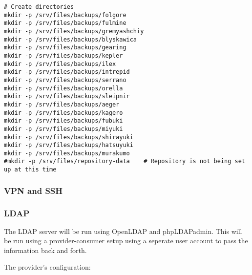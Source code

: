\documentclass[12pt]{spieman}  %
\begin{document}
\begin{lstlisting}
# Create directories
mkdir -p /srv/files/backups/folgore
mkdir -p /srv/files/backups/fulmine
mkdir -p /srv/files/backups/gremyashchiy
mkdir -p /srv/files/backups/blyskawica
mkdir -p /srv/files/backups/gearing
mkdir -p /srv/files/backups/kepler
mkdir -p /srv/files/backups/ilex
mkdir -p /srv/files/backups/intrepid
mkdir -p /srv/files/backups/serrano
mkdir -p /srv/files/backups/orella
mkdir -p /srv/files/backups/sleipnir
mkdir -p /srv/files/backups/aeger
mkdir -p /srv/files/backups/kagero
mkdir -p /srv/files/backups/fubuki
mkdir -p /srv/files/backups/miyuki
mkdir -p /srv/files/backups/shirayuki
mkdir -p /srv/files/backups/hatsuyuki
mkdir -p /srv/files/backups/murakumo
#mkdir -p /srv/files/repository-data	# Repository is not being set up at this time
\end{lstlisting}

\subsubsection{VPN and SSH}
\label{subsubsec:vpn-config}

\subsubsection{LDAP}
\label{subsubsec:ldap-config}

The LDAP server will be run using OpenLDAP and phpLDAPadmin. This will be run using a provider-consumer setup using a seperate user account to pass the information back and forth.

The provider's configuration:
\end{document}
